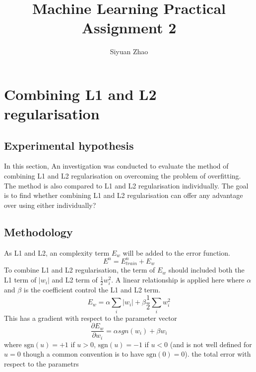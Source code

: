 \documentclass[11pt]{article}
\begin{document}
\title{Machine Learning Practical \\Assignment 2}

\author{Siyuan Zhao}
\maketitle
\section{Combining L1 and L2 regularisation}

\subsection{Experimental hypothesis}
In this section, An investigation was conducted to evaluate the method of combining L1 and L2 regularisation on overcoming the problem of overfitting. The method is also compared to L1 and L2 regularisation individually. The goal is to find whether combining L1 and L2 regularisation can offer any advantage over using either individually?

\subsection{Methodology}
As L1 and L2, an complexity term $E_w$ will be added to the error function.
\begin{equation}
	E^n = E_{train}^n + E_w
\end{equation}
To combine L1 and L2 regularisation, the term of $E_w$ should included both the L1 term of $|w_i|$ and L2 term of $\frac{1}{2}w_i^2$. A linear relationship is applied here where $\alpha$ and $\beta$ is the coefficient control the L1 and L2 term.
\begin{equation}
	E_w = \alpha \sum_i|w_i| + \beta \frac{1}{2}\sum_iw_i^2
\end{equation}
This has a gradient with respect to the parameter vector
\begin{equation}
	\frac{\partial E_w}{\partial w_i} = \alpha sgn(w_i) + \beta w_i
\end{equation}
where $\textrm{sgn}(u) = +1$ if $u > 0$, $\textrm{sgn}(u) = -1$ if $u < 0$ (and is not well defined for $u=0$ though a common convention is to have $\textrm{sgn}(0) = 0$).
the total error with respect to the parametrs
\end{document}

